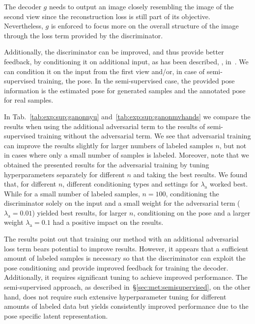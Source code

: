 \documentclass[10pt,twocolumn,letterpaper]{article}
\begin{document}
The decoder $g$ needs to output an image closely resembling 
the image of the second view
since the reconstruction loss is still part of its objective.
Nevertheless, $g$ is enforced to focus more on the overall structure of the image 
through the loss term provided by the discriminator.

Additionally, the discriminator can be improved, and thus provide better feedback,
by conditioning it on additional input, 
as has been described, \eg, in~\cite{Mirza2014arxiv_condgan}.
We can condition it on the input from the first view and/or, 
in case of semi-supervised training, the pose.
In the semi-supervised case, the provided pose information is the estimated pose 
for generated samples and the annotated pose for real samples.

In Tab.~\ref{tab:exp:sup:ganonnyu} and~\ref{tab:exp:sup:ganonmvhands} 
we compare the results when using the additional adversarial term
to the results of semi-supervised training without the adversarial term.
We see that adversarial training can improve the results slightly 
for larger numbers of labeled samples $n$, 
but not in cases where only a small number of samples is labeled.
Moreover, note that we obtained the presented results for the adversarial training 
by tuning hyperparameters separately for different $n$ and taking the best results. 
We found that, for different $n$, different conditioning types and settings for 
$\lambda_{\mathrm{a}}$ worked best.
While for a small number of labeled samples, $n = 100$, 
conditioning the discriminator solely on the input and 
a small weight for the adversarial term ($\lambda_{\mathrm{a}} = 0.01$) yielded best results, 
for larger $n$, conditioning on the pose and a larger weight 
$\lambda_{\mathrm{a}} = 0.1$ had a positive impact on the results.

The results point out that training our method with an additional adversarial loss term 
bears potential to improve results.
However, it appears that a sufficient amount of labeled samples is necessary
so that the discriminator can exploit the pose conditioning and 
provide improved feedback for training the decoder.
Additionally, it requires significant tuning to achieve improved performance.
The semi-supervised approach, as described in~\S\ref{sec:met:semisupervised},
on the other hand, does not require such extensive hyperparameter tuning 
for different amounts of labeled data but 
yields consistently improved performance due to the pose specific latent representation.
\end{document}
